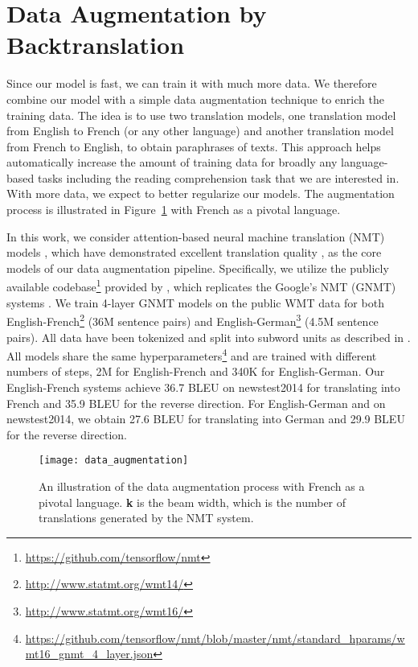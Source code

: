 \documentclass{article} \usepackage{iclr2018_conference,times}
\begin{document}
 \section{Data Augmentation by Backtranslation}\label{sec:aug}
Since our model is fast, we can train it with much more data. We therefore combine our model with a simple data augmentation technique to enrich the training data. The idea is to use two translation models, one translation model from English to French (or any other language) and another translation model from French to English, to obtain paraphrases of texts. This approach helps automatically increase the amount of training data for broadly any language-based tasks including the reading comprehension task that we are interested in. With more data, we expect to better regularize our models. The augmentation process is illustrated in Figure~\ref{data_augmentation} with French as a pivotal language. 

In this work, we consider attention-based neural machine translation (NMT) models \cite{bahdanau2014neural,luong15attn}, which have demonstrated excellent translation quality \cite{wu2016google}, as the core models of our data augmentation pipeline. Specifically, we utilize the publicly available codebase\footnote{\url{https://github.com/tensorflow/nmt}} provided by \citet{luong17}, which replicates the Google's NMT (GNMT) systems \cite{wu2016google}. 
We train 4-layer GNMT models on the public WMT data for both English-French\footnote{\url{http://www.statmt.org/wmt14/}}  (36M sentence pairs) and English-German\footnote{\url{http://www.statmt.org/wmt16/}} (4.5M sentence pairs). All data have been tokenized and split into subword units as described in \cite{luong17}. All models share the same hyperparameters\footnote{\url{https://github.com/tensorflow/nmt/blob/master/nmt/standard_hparams/wmt16_gnmt_4_layer.json}} and are trained with different numbers of steps, 2M for English-French and 340K for English-German.
Our English-French systems achieve 36.7 BLEU on newstest2014 for translating into French and 35.9 BLEU for the reverse direction. For English-German and on newstest2014, we obtain 27.6 BLEU for translating into German and 29.9 BLEU for the reverse direction.

\begin{figure}[!ht]
 \centering
 \texttt{[image: data\_augmentation]}
 \caption{An illustration of the data augmentation process with French as a pivotal language. \textbf{k} is the beam width, which is the number of translations generated by the NMT system.}
\label{data_augmentation}
\end{figure}
\end{document}

